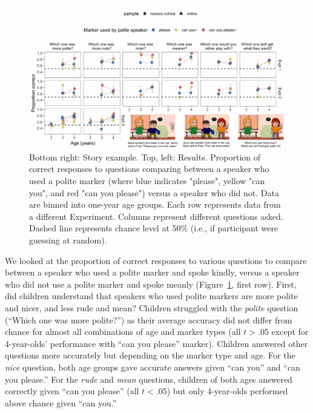 \documentclass[10pt, letterpaper]{article}
\newenvironment{CodeChunk}{}{}
\begin{document}
\begin{CodeChunk}
\begin{figure}[h]

{\centering \includegraphics{figs/fig_results_placement-1} 

}

\caption[Bottom right]{Bottom right: Story example. Top, left: Results. Proportion of correct responses to questions comparing between a speaker who used a polite marker (where blue indicates "please", yellow "can you", and red "can you please") versus a speaker who did not. Data are binned into one-year age groups. Each row represents data from a different Experiment. Columns represent different questions asked. Dashed line represents chance level at 50\% (i.e., if participant were guessing at random).}\label{fig:fig_results_placement}
\end{figure}
\end{CodeChunk}

We looked at the proportion of correct responses to various questions to
compare between a speaker who used a polite marker and spoke kindly,
versus a speaker who did not use a polite marker and spoke meanly
(Figure~\ref{fig:fig_results_placement}, first row). First, did children
understand that speakers who used polite markers are more polite and
nicer, and less rude and mean? Children struggled with the \emph{polite}
question (``Which one was more polite?'') as their average accuracy did
not differ from chance for almost all combinations of age and marker
types (all \(t>\).05 except for 4-year-olds' performance with ``can you
please'' marker). Children answered other questions more accurately but
depending on the marker type and age. For the \emph{nice} question, both
age groups gave accurate answers given ``can you'' and ``can you
please.'' For the \emph{rude} and \emph{mean} questions, children of
both ages answered correctly given ``can you please'' (all \(t<\).05)
but only 4-year-olds performed above chance given ``can you.''
\end{document}
